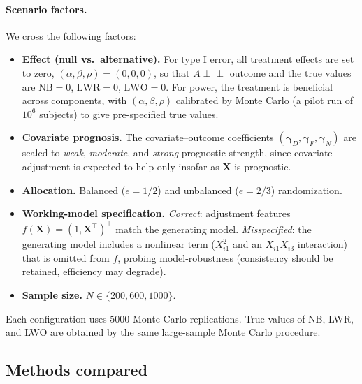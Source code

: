 \documentclass[11pt,a4paper]{article}
\begin{document}
\paragraph{Scenario factors.}
We cross the following factors:
\begin{itemize}
\item \textbf{Effect (null vs.\ alternative).} For type I error, all treatment effects are
   set to zero, $(\alpha,\beta,\rho)=(0,0,0)$, so that $A\perp\!\!\!\perp$ outcome and the
   true values are $\mathrm{NB}=0$, $\mathrm{LWR}=0$, $\mathrm{LWO}=0$. For power, the
   treatment is beneficial across components, with $(\alpha,\beta,\rho)$ calibrated by
   Monte Carlo (a pilot run of $10^6$ subjects) to give pre-specified true values.
\item \textbf{Covariate prognosis.} The covariate--outcome coefficients
   $(\boldsymbol\gamma_D,\boldsymbol\gamma_F,\boldsymbol\gamma_N)$ are scaled to
   \emph{weak}, \emph{moderate}, and \emph{strong} prognostic strength, since covariate
   adjustment is expected to help only insofar as $\mathbf X$ is prognostic.
\item \textbf{Allocation.} Balanced ($e=1/2$) and unbalanced ($e=2/3$) randomization.
\item \textbf{Working-model specification.} \emph{Correct}: adjustment features
   $f(\mathbf X)=(1,\mathbf X^\top)^\top$ match the generating model.
   \emph{Misspecified}: the generating model includes a nonlinear term
   ($X_{i1}^2$ and an $X_{i1}X_{i3}$ interaction) that is omitted from $f$, probing
   model-robustness (consistency should be retained, efficiency may degrade).
\item \textbf{Sample size.} $N\in\{200, 600,1000\}$.
\end{itemize}
Each configuration uses $5000$ Monte Carlo replications. True values of NB, LWR, and LWO
are obtained by the same large-sample Monte Carlo procedure.

\subsection{Methods compared}\label{sec:sim_methods}
\end{document}
